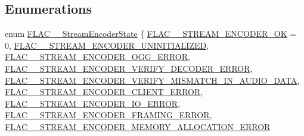 \subsection*{Enumerations}
\begin{DoxyCompactItemize}
\item 
enum \hyperlink{group__flac__stream__encoder_gac5e9db4fc32ca2fa74abd9c8a87c02a5}{F\+L\+A\+C\+\_\+\+\_\+\+Stream\+Encoder\+State} \{ \newline
\hyperlink{group__flac__stream__encoder_ggac5e9db4fc32ca2fa74abd9c8a87c02a5a3a6666ae61a64d955341cec285695bf6}{F\+L\+A\+C\+\_\+\+\_\+\+S\+T\+R\+E\+A\+M\+\_\+\+E\+N\+C\+O\+D\+E\+R\+\_\+\+OK} = 0, 
\hyperlink{group__flac__stream__encoder_ggac5e9db4fc32ca2fa74abd9c8a87c02a5a04912e04a3c57d3c53de34742f96d635}{F\+L\+A\+C\+\_\+\+\_\+\+S\+T\+R\+E\+A\+M\+\_\+\+E\+N\+C\+O\+D\+E\+R\+\_\+\+U\+N\+I\+N\+I\+T\+I\+A\+L\+I\+Z\+ED}, 
\hyperlink{group__flac__stream__encoder_ggac5e9db4fc32ca2fa74abd9c8a87c02a5abb312cc8318c7a541cadacd23ceb3bbb}{F\+L\+A\+C\+\_\+\+\_\+\+S\+T\+R\+E\+A\+M\+\_\+\+E\+N\+C\+O\+D\+E\+R\+\_\+\+O\+G\+G\+\_\+\+E\+R\+R\+OR}, 
\hyperlink{group__flac__stream__encoder_ggac5e9db4fc32ca2fa74abd9c8a87c02a5a4cb80be4f83eb71f04e74968af1d259e}{F\+L\+A\+C\+\_\+\+\_\+\+S\+T\+R\+E\+A\+M\+\_\+\+E\+N\+C\+O\+D\+E\+R\+\_\+\+V\+E\+R\+I\+F\+Y\+\_\+\+D\+E\+C\+O\+D\+E\+R\+\_\+\+E\+R\+R\+OR}, 
\newline
\hyperlink{group__flac__stream__encoder_ggac5e9db4fc32ca2fa74abd9c8a87c02a5a011e3d8b2d02a940bfd0e59c05cf5ae0}{F\+L\+A\+C\+\_\+\+\_\+\+S\+T\+R\+E\+A\+M\+\_\+\+E\+N\+C\+O\+D\+E\+R\+\_\+\+V\+E\+R\+I\+F\+Y\+\_\+\+M\+I\+S\+M\+A\+T\+C\+H\+\_\+\+I\+N\+\_\+\+A\+U\+D\+I\+O\+\_\+\+D\+A\+TA}, 
\hyperlink{group__flac__stream__encoder_ggac5e9db4fc32ca2fa74abd9c8a87c02a5a8c2b2e9efb43a4f9b25b1d2bd9af5f23}{F\+L\+A\+C\+\_\+\+\_\+\+S\+T\+R\+E\+A\+M\+\_\+\+E\+N\+C\+O\+D\+E\+R\+\_\+\+C\+L\+I\+E\+N\+T\+\_\+\+E\+R\+R\+OR}, 
\hyperlink{group__flac__stream__encoder_ggac5e9db4fc32ca2fa74abd9c8a87c02a5af0e4738522e05a7248435c7148f58f91}{F\+L\+A\+C\+\_\+\+\_\+\+S\+T\+R\+E\+A\+M\+\_\+\+E\+N\+C\+O\+D\+E\+R\+\_\+\+I\+O\+\_\+\+E\+R\+R\+OR}, 
\hyperlink{group__flac__stream__encoder_ggac5e9db4fc32ca2fa74abd9c8a87c02a5a2c2937b7f1600a4ac7c84fc70ab34cf1}{F\+L\+A\+C\+\_\+\+\_\+\+S\+T\+R\+E\+A\+M\+\_\+\+E\+N\+C\+O\+D\+E\+R\+\_\+\+F\+R\+A\+M\+I\+N\+G\+\_\+\+E\+R\+R\+OR}, 
\newline
\hyperlink{group__flac__stream__encoder_ggac5e9db4fc32ca2fa74abd9c8a87c02a5a35db99d9958bd6c2301a04715fbc44fd}{F\+L\+A\+C\+\_\+\+\_\+\+S\+T\+R\+E\+A\+M\+\_\+\+E\+N\+C\+O\+D\+E\+R\+\_\+\+M\+E\+M\+O\+R\+Y\+\_\+\+A\+L\+L\+O\+C\+A\+T\+I\+O\+N\+\_\+\+E\+R\+R\+OR}

\end{DoxyCompactItemize}
